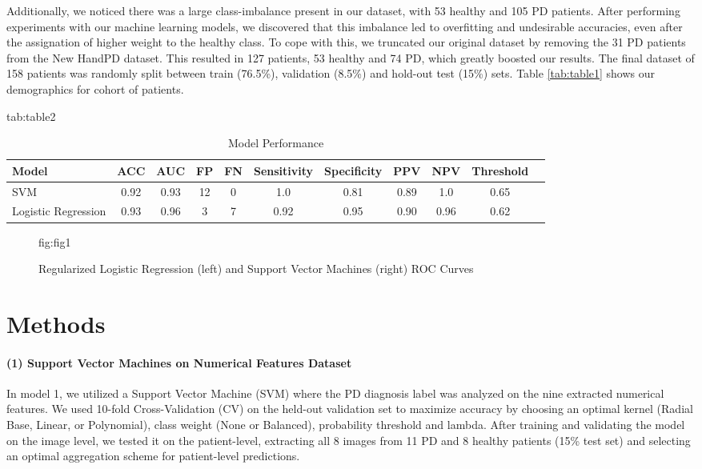 \documentclass[pmlr,twocolumn,10pt]{jmlr} %
\begin{document}
Additionally, we noticed there was a large class-imbalance present in our dataset, with 53 healthy and 105 PD patients. After performing experiments with our machine learning models, we discovered that this imbalance led to overfitting and undesirable accuracies, even after the assignation of higher weight to the healthy class. To cope with this, we truncated our original dataset by removing the 31 PD patients from the New HandPD dataset. This resulted in 127 patients, 53 healthy and 74 PD, which greatly boosted our results. The final dataset of 158 patients was randomly split between train (76.5\%), validation (8.5\%) and hold-out test (15\%) sets. Table \ref{tab:table1} shows our demographics for cohort of patients. 

\begin{table*}[hbtp]
\centering 
\floatconts
{tab:table2}
{\caption{Model Performance}}
    {
        \begin{tabular}{lcccccccccc}
        \toprule
        \bfseries Model & \bfseries ACC & \bfseries AUC & \bfseries FP & \bfseries FN & \bfseries Sensitivity & \bfseries Specificity & \bfseries PPV & \bfseries NPV & \bfseries Threshold \\
        \midrule
        SVM & 0.92 & 0.93 & 12 & 0 & 1.0 & 0.81 & 0.89 & 1.0 & 0.65 \\
        Logistic Regression & 0.93 & 0.96 & 3 & 7 & 0.92 & 0.95 & 0.90 & 0.96 & 0.62 \\
        \bottomrule
        \end{tabular}
    }
\end{table*}

\begin{figure*}[hbtp]
\centering
\floatconts
{fig:fig1}
{\caption{Regularized Logistic Regression (left) and Support Vector Machines (right) ROC Curves}}


\end{figure*}

\section{Methods}
\label{Methodology}

\label{sec:SVM}  
\paragraph{(1) Support Vector Machines on Numerical Features Dataset} In model 1, we utilized a Support Vector Machine (SVM) \citep{708428} where the PD diagnosis label was analyzed on the nine extracted numerical features. We used 10-fold Cross-Validation (CV) \citep{stone1974cross} on the held-out validation set to maximize accuracy by choosing an optimal kernel (Radial Base, Linear, or Polynomial), class weight (None or Balanced), probability threshold and lambda. After training and validating the model on the image level, we tested it on the patient-level, extracting all 8 images from 11 PD and 8 healthy patients (15\% test set) and selecting an optimal aggregation scheme for patient-level predictions.  
\end{document}

